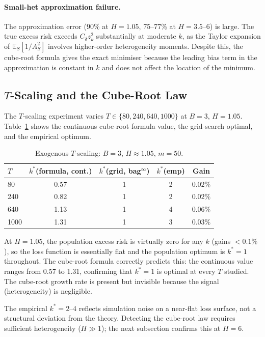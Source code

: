 \documentclass[12pt,a4paper]{article}
\begin{document}
\paragraph{Small-het approximation failure.}
The approximation error (90\% at $H=1.05$, 75--77\% at $H=3.5$--6) is large.
The true excess risk exceeds $C_\delta z_k^2$ substantially at moderate $k$,
as the Taylor expansion of $\mathbb{E}_S[1/A_S^2]$ involves higher-order
heterogeneity moments. Despite this, the cube-root formula gives the exact
minimiser because the leading bias term in the approximation is constant in
$k$ and does not affect the location of the minimum.

\subsection{$T$-Scaling and the Cube-Root Law}

The $T$-scaling experiment varies $T \in \{80, 240, 640, 1000\}$ at
$B=3$, $H=1.05$. Table~\ref{tab:exo_scaling} shows the continuous cube-root
formula value, the grid-search optimal, and the empirical optimum.

\begin{table}[h]
\centering
\caption{Exogenous $T$-scaling: $B=3$, $H\approx1.05$, $m=50$.}
\label{tab:exo_scaling}
\begin{tabular}{lcccc}
\toprule
$T$ & $k^*$(formula, cont.) & $k^*$(grid, bag$^\infty$) & $k^*$(emp) & Gain \\
\midrule
80   & 0.57 & 1 & 2 & $0.02\%$ \\
240  & 0.82 & 1 & 2 & $0.02\%$ \\
640  & 1.13 & 1 & 4 & $0.06\%$ \\
1000 & 1.31 & 1 & 3 & $0.03\%$ \\
\bottomrule
\end{tabular}
\end{table}

At $H=1.05$, the population excess risk is virtually zero for any $k$
(gains $< 0.1\%$), so the loss function is essentially flat and the
population optimum is $k^*=1$ throughout. The cube-root formula
correctly predicts this: the continuous value ranges from 0.57 to 1.31,
confirming that $k^*=1$ is optimal at every $T$ studied. The cube-root
growth rate is present but invisible because the signal (heterogeneity)
is negligible.

The empirical $k^* = 2$--4 reflects simulation noise on a near-flat loss
surface, not a structural deviation from the theory. Detecting the cube-root
law requires sufficient heterogeneity ($H \gg 1$); the next subsection
confirms this at $H=6$.
\end{document}
